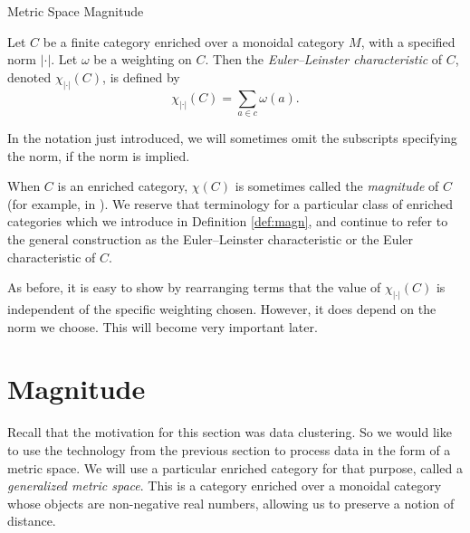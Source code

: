 \documentclass[12pt]{pom_thesis}
\begin{document}
\begin{chapter}{Metric Space Magnitude}
\begin{defn}
Let $C$ be a finite category enriched over a monoidal category $M$, with a specified norm $|\cdot|$. Let $\omega$ be a weighting on $C$. Then the \emph{Euler--Leinster characteristic} of $C$, denoted $\chi_{|\cdot|}(C)$, is defined by
\[
\chi_{|\cdot|}(C) = \sum_{a \in c} \omega(a).
\]
\end{defn}
In the notation just introduced, we will sometimes omit the subscripts specifying the norm, if the norm is implied.
\begin{rmk}
When $C$ is an enriched category, $\chi(C)$ is sometimes called the \emph{magnitude} of $C$ (for example, in \cite{Lein4}). We reserve that terminology for a particular class of enriched categories which we introduce in Definition \ref{def:magn}, and continue to refer to the general construction as the Euler--Leinster characteristic or the Euler characteristic of $C$.
\end{rmk}
\begin{rmk}
As before, it is easy to show by rearranging terms that the value of $\chi_{|\cdot|}(C)$ is independent of the specific weighting chosen. However, it does depend on the norm we choose. This will become very important later.
\end{rmk}

\section{Magnitude}
Recall that the motivation for this section was data clustering. So we would like to use the technology from the previous section to process data in the form of a metric space. We will use a particular enriched category for that purpose, called a \emph{generalized metric space}. This is a category enriched over a monoidal category whose objects are non-negative real numbers, allowing us to preserve a notion of distance.  


\end{chapter}
\end{document}
